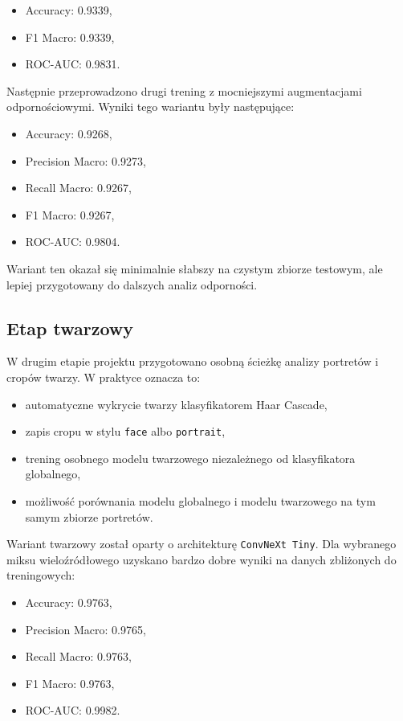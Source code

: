 \begin{itemize}
    \item Accuracy: 0.9339,
    \item F1 Macro: 0.9339,
    \item ROC-AUC: 0.9831.
\end{itemize}

Następnie przeprowadzono drugi trening z mocniejszymi augmentacjami odpornościowymi. Wyniki tego wariantu były następujące:

\begin{itemize}
    \item Accuracy: 0.9268,
    \item Precision Macro: 0.9273,
    \item Recall Macro: 0.9267,
    \item F1 Macro: 0.9267,
    \item ROC-AUC: 0.9804.
\end{itemize}

Wariant ten okazał się minimalnie słabszy na czystym zbiorze testowym, ale lepiej przygotowany do dalszych analiz odporności.

\subsection{Etap twarzowy}

W drugim etapie projektu przygotowano osobną ścieżkę analizy portretów i cropów twarzy. W praktyce oznacza to:

\begin{itemize}
    \item automatyczne wykrycie twarzy klasyfikatorem Haar Cascade,
    \item zapis cropu w stylu \texttt{face} albo \texttt{portrait},
    \item trening osobnego modelu twarzowego niezależnego od klasyfikatora globalnego,
    \item możliwość porównania modelu globalnego i modelu twarzowego na tym samym zbiorze portretów.
\end{itemize}

Wariant twarzowy został oparty o architekturę \texttt{ConvNeXt Tiny}. Dla wybranego miksu wieloźródłowego uzyskano bardzo dobre wyniki na danych zbliżonych do treningowych:

\begin{itemize}
    \item Accuracy: 0.9763,
    \item Precision Macro: 0.9765,
    \item Recall Macro: 0.9763,
    \item F1 Macro: 0.9763,
    \item ROC-AUC: 0.9982.
\end{itemize}

